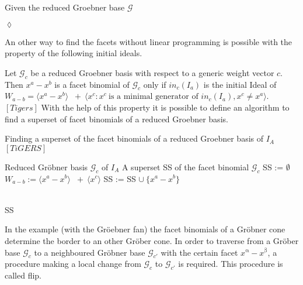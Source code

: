 \begin{env_example}\normalfont
Given the reduced Groebner base $\mathcal{G}$

\begin{flushright}
$\lozenge$
\end{flushright}
\end{env_example}

An other way to find the facets without linear programming is possible with the property of the following initial ideals.

Let $\mathcal{G}_{c} $ be a reduced Groebner basis with respect to a generic weight vector $c$. Then $x^{a} - x^{b}$ is a facet binomial of $\mathcal{G}_{c}$ only if $in_{c}(I_{a}) $ is the initial Ideal of $W_{a - b} = \langle x^{a}-x^{b}\rangle$
$~+~ \langle x^{c}  : x^{c}~\textrm{is a minimal generator of~} in_{c}(I_{a}), x^{c} \neq x^{a} \rangle$.$[Tigers]$
With the help of this property it is possible to define an algorithm to find a superset of facet binomials of a reduced Groebner basis.

\begin{algorithm}
\caption{Finding a superset of the facet binomials
of a reduced Groebner basis of $I_A$ $\left[ TiGERS\right]  $}
\label{alg:facetSS}
\begin{algorithmic}[1]

\Require
Reduced Gröbner basis $ \mathcal{G}_{c} $ of $I_A$
\Ensure A superset SS of the facet binomial $\mathcal{G}_{c}$
\State SS := $\emptyset$
\State $W_{a - b} := \langle x^{a}-x^{b}\rangle$
$~+~ \langle x^{c} \rangle$ 
\State SS := SS $\cup~ \{x^{a}-x^{b} \}$

\EndIf
\EndFor \\
\Return SS

\end{algorithmic}
\end{algorithm}
 






In the example (with the Gröebner fan) the facet binomials of a Gröbner cone determine the border to an other Gröber cone.
In order to traverse from a Gröber base $\mathcal{G}_c$ to a neighboured Gröbner base $\mathcal{G}_{c'}$ with the certain facet $x^{\upalpha}-x^{\upbeta} $, a procedure making a local change from $\mathcal{G}_c$ to $\mathcal{G}_{c'}$ is required.
This procedure is called flip.


